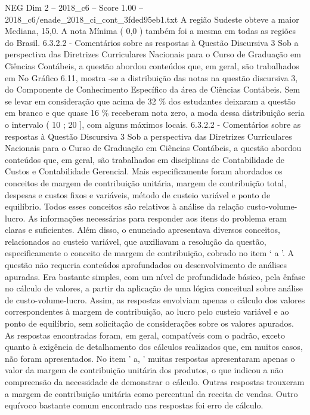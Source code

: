 \begin{textsample}{NEG Dim 2 – 2018\_c6 – Score 1.00 – 2018\_c6/enade\_2018\_ci\_cont\_3fded95eb1.txt}
A região Sudeste obteve a maior Mediana, 15,0.
A nota Mínima ( 0,0 ) também foi a mesma em todas as regiões do Brasil. 6.3.2.2 - Comentários sobre as respostas à Questão Discursiva 3 Sob a perspectiva das Diretrizes Curriculares Nacionais para o Curso de Graduação em Ciências Contábeis, a questão abordou conteúdos que, em geral, são trabalhados em No Gráfico 6.11, mostra -se a distribuição das notas na questão discursiva 3, do Componente de Conhecimento Específico da área de Ciências Contábeis.
Sem se levar em consideração que acima de 32 \% dos estudantes deixaram a questão em branco e que quase 16 \% receberam nota zero, a moda dessa distribuição seria o intervalo ( 10 ; 20 ], com alguns máximos locais. 6.3.2.2 - Comentários sobre as respostas à Questão Discursiva 3 Sob a perspectiva das Diretrizes Curriculares Nacionais para o Curso de Graduação em Ciências Contábeis, a questão abordou conteúdos que, em geral, são trabalhados em disciplinas de Contabilidade de Custos e Contabilidade Gerencial.
Mais especificamente foram abordados os conceitos de margem de contribuição unitária, margem de contribuição total, despesas e custos fixos e variáveis, método de custeio variável e ponto de equilíbrio.
Todos esses conceitos são relativos à análise da relação custo-volume-lucro.
As informações necessárias para responder aos itens do problema eram claras e suficientes.
Além disso, o enunciado apresentava diversos conceitos, relacionados ao custeio variável, que auxiliavam a resolução da questão, especificamente o conceito de margem de contribuição, cobrado no item ‘ a ’.
A questão não requeria conteúdos aprofundados ou desenvolvimento de análises apuradas.
Era bastante simples, com um nível de profundidade básico, pela ênfase no cálculo de valores, a partir da aplicação de uma lógica conceitual sobre análise de custo-volume-lucro.
Assim, as respostas envolviam apenas o cálculo dos valores correspondentes à margem de contribuição, ao lucro pelo custeio variável e ao ponto de equilíbrio, sem solicitação de considerações sobre os valores apurados.
As respostas encontradas foram, em geral, compatíveis com o padrão, exceto quanto à exigência de detalhamento dos cálculos realizados que, em muitos casos, não foram apresentados.
No item ' a, ' muitas respostas apresentaram apenas o valor da margem de contribuição unitária dos produtos, o que indicou a não compreensão da necessidade de demonstrar o cálculo.
Outras respostas trouxeram a margem de contribuição unitária como percentual da receita de vendas.
Outro equívoco bastante comum encontrado nas respostas foi erro de cálculo.

\end{textsample}
